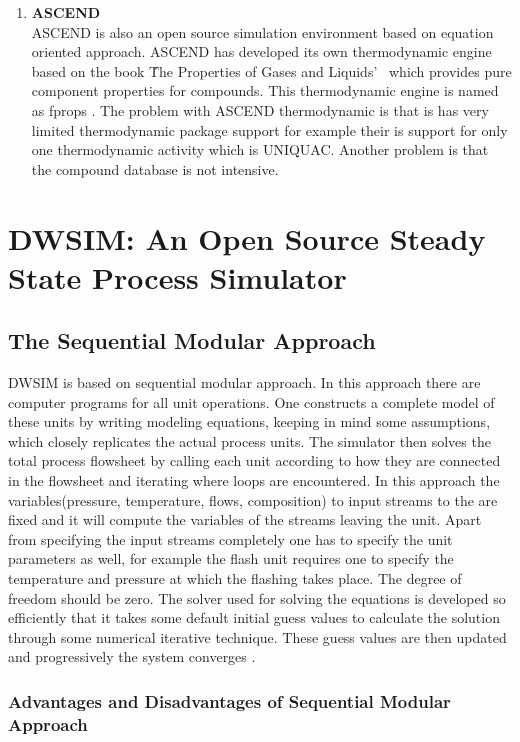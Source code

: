 \documentclass[12pt]{report}
\begin{document}
\begin{enumerate}
\item{\textbf{ASCEND}} \\
ASCEND is also an open source simulation environment based on equation oriented approach. ASCEND has developed its own thermodynamic engine based on the book \'The Properties of Gases and Liquids'\ \cite{ascend} which provides pure component properties for compounds. This thermodynamic engine is named as fprops  \cite{fprops}. The problem with ASCEND thermodynamic is that is has very limited thermodynamic package support for example their is support for only one thermodynamic activity which is UNIQUAC. Another problem is that the compound database is not intensive.
\end{enumerate}


\chapter{DWSIM: An Open Source Steady State Process Simulator}
\section{The Sequential Modular Approach}
DWSIM is based on sequential modular approach. In this approach there are computer programs for all unit operations. One constructs a complete model of these units by writing modeling equations, keeping in mind some assumptions, which closely replicates the actual process units. The simulator then solves the total process flowsheet by calling each unit according to how they are connected in the flowsheet and iterating where loops are encountered. In this approach the variables(pressure, temperature, flows, composition) to input streams to the are fixed and it will compute the variables of the streams leaving the unit. Apart from specifying the input streams completely one has to specify the unit parameters as well, for example the flash unit requires one to specify the temperature and pressure at which the flashing takes place. The degree of freedom should be zero. The solver used for solving the equations is developed so efficiently that it takes some default initial guess values to calculate the solution through some numerical iterative technique. These guess values are then updated and progressively the system converges \cite{SM}.

\subsection{Advantages and Disadvantages of Sequential Modular Approach}
\end{document}
